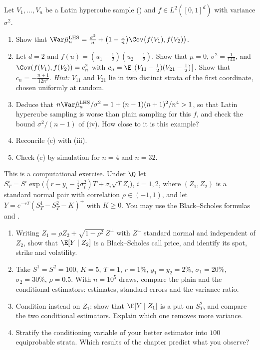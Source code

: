 \begin{exercise}\label{ex:st-lhs-interaction}
\hard Let $V_1,\dots,V_n$ be a Latin hypercube sample () and
$f\in L^2([0,1]^d)$ with variance $\sigma^2$.
\begin{enumerate}[label=(\alph*)]
  \item Show that $\Var\hat\mu^{\mathrm{LHS}}_n=\frac{\sigma^2}n+\big(1-\frac1n\big)\Cov\big(f(V_1),f(V_2)\big)$.
  \item Let $d=2$ and $f(u)=(u_1-\frac12)(u_2-\frac12)$. Show that $\mu=0$, $\sigma^2=\frac1{144}$,
    and $\Cov(f(V_1),f(V_2))=c_n^2$ with $c_n=\E\big[(V_{11}-\frac12)(V_{21}-\frac12)\big]$.
    Show that $c_n=-\frac{n+1}{12n^2}$. \emph{Hint:} $V_{11}$ and $V_{21}$ lie in two distinct
    strata of the first coordinate, chosen uniformly at random.
  \item Deduce that $n\Var\hat\mu^{\mathrm{LHS}}_n/\sigma^2=1+(n-1)(n+1)^2/n^4>1$, so that Latin
    hypercube sampling is worse than plain sampling for this $f$, and check the bound
    $\sigma^2/(n-1)$ of (iv). How close to it is this example?
  \item Reconcile (c) with (iii).
  \item Check (c) by simulation for $n=4$ and $n=32$.
\end{enumerate}
\end{exercise}

\begin{exercise}\label{ex:st-spread}
\medium This is a computational exercise. Under $\Q$ let
$S^i_T=S^i\exp\big((r-y_i-\frac12\sigma_i^2)T+\sigma_i\sqrt TZ_i\big)$, $i=1,2$, where $(Z_1,Z_2)$
is a standard normal pair with correlation $\rho\in(-1,1)$, and let
$Y=e^{-rT}(S^1_T-S^2_T-K)^+$ with $K\ge0$. You may use the Black--Scholes formulas and
.
\begin{enumerate}[label=(\alph*)]
  \item Writing $Z_1=\rho Z_2+\sqrt{1-\rho^2}\,Z^\perp$ with $Z^\perp$ standard normal and
    independent of $Z_2$, show that $\E[Y\mid Z_2]$ is a Black--Scholes call price, and
    identify its spot, strike and volatility.
  \item Take $S^1=S^2=100$, $K=5$, $T=1$, $r=1\%$, $y_1=y_2=2\%$, $\sigma_1=20\%$,
    $\sigma_2=30\%$, $\rho=0.5$. With $n=10^5$ draws, compare the plain and the conditional
    estimators: estimates, standard errors and the variance ratio.
  \item Condition instead on $Z_1$: show that $\E[Y\mid Z_1]$ is a put on $S^2_T$, and compare
    the two conditional estimators. Explain which one removes more variance.
  \item Stratify the conditioning variable of your better estimator into $100$ equiprobable
    strata. Which results of the chapter predict what you observe?
\end{enumerate}
\end{exercise}

